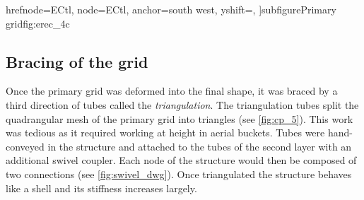 {{{				hrefnode=ECtl,
				node=ECtl, 
				anchor=south west, 
				yshift=\PhotoRefSkip,
				]{subfigure}{}{Primary grid}{fig:erec_4c}
		}
	}
}

\subsection{Bracing of the grid}
Once the primary grid was deformed into the final shape, it was braced by a third direction of tubes called the \emph{triangulation}. The triangulation tubes split the quadrangular mesh of the primary grid into triangles (see \cref{fig:cp_5}). This work was tedious as it required working at height in aerial buckets. Tubes were hand-conveyed in the structure and attached to the tubes of the second layer with an additional swivel coupler. Each node of the structure would then be composed of two connections (see \cref{fig:swivel_dwg}). Once triangulated the structure behaves like a shell and its stiffness increases largely.





